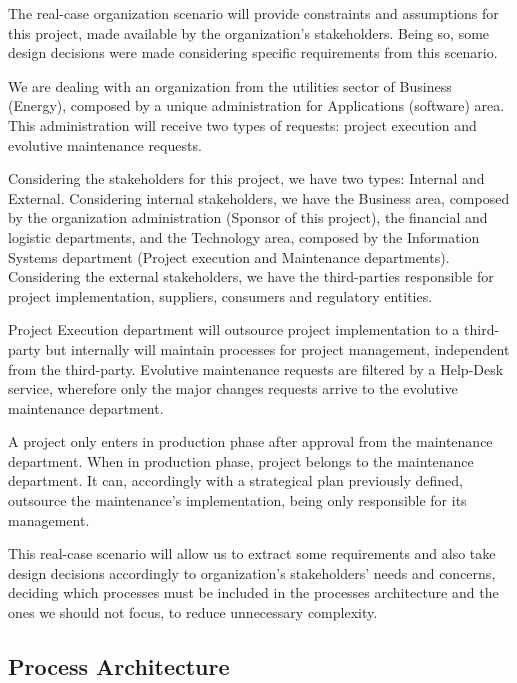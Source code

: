 The real-case organization scenario will provide constraints and assumptions for this project, made available by the organization's stakeholders. Being so, some design decisions were made considering specific requirements from this scenario.\par
We are dealing with an organization from the utilities sector of Business (Energy), composed by a unique administration for Applications (software) area. This administration will receive two types of requests: project execution and evolutive maintenance requests.\par
Considering the stakeholders for this project, we have two types: Internal and External. Considering internal stakeholders, we have the Business area, composed by the organization administration (Sponsor of this project), the financial and logistic departments, and the Technology area, composed by the Information Systems department (Project execution and Maintenance departments). Considering the external stakeholders, we have the third-parties responsible for project implementation, suppliers, consumers and regulatory entities.\par
Project Execution department will outsource project implementation to a third-party but internally will maintain processes for project management, independent from the third-party. Evolutive maintenance requests are filtered by a Help-Desk service, wherefore only the major changes requests arrive to the evolutive maintenance department.\par
A project only enters in production phase after approval from the maintenance department. When in production phase, project belongs to the maintenance department. It can, accordingly with a strategical plan previously defined, outsource the maintenance's implementation, being only responsible for its management.\par
This real-case scenario will allow us to extract some requirements and also take design decisions accordingly to organization's stakeholders' needs and concerns, deciding which processes must be included in the processes architecture and the ones we should not focus, to reduce unnecessary complexity.\par


\subsection{Process Architecture}

